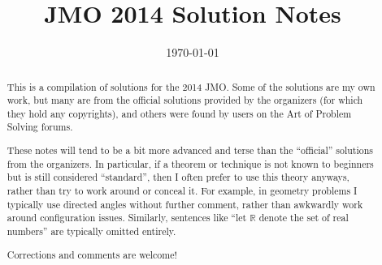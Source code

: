 \documentclass[11pt]{scrartcl}
\title{JMO 2014 Solution Notes}
\date{\today}
\begin{document}
\maketitle

\begin{abstract}
This is a compilation of solutions
for the 2014 JMO.
Some of the solutions are my own work,
but many are from the official solutions provided by the organizers
(for which they hold any copyrights),
and others were found by users on the Art of Problem Solving forums.

These notes will tend to be a bit more advanced and terse than the ``official''
solutions from the organizers.
In particular, if a theorem or technique is not known to beginners
but is still considered ``standard'', then I often prefer to
use this theory anyways, rather than try to work around or conceal it.
For example, in geometry problems I typically use directed angles
without further comment, rather than awkwardly work around configuration issues.
Similarly, sentences like ``let $\mathbb{R}$ denote the set of real numbers''
are typically omitted entirely.

Corrections and comments are welcome!
\end{abstract}

\tableofcontents
\newpage

\addtocounter{section}{-1}
\end{document}
